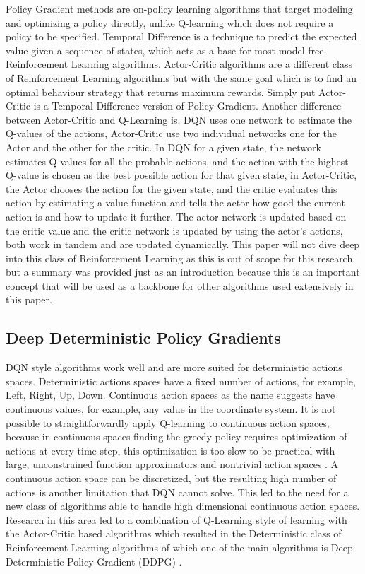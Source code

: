 Policy Gradient \cite{PG} methods are on-policy learning algorithms that target modeling and optimizing a policy directly, unlike Q-learning which does not require a policy to be specified. Temporal Difference \cite{TD} is a technique to predict the expected value given a sequence of states, which acts as a base for most model-free Reinforcement Learning algorithms. Actor-Critic \cite{Konda00actor-criticalgorithms} algorithms are a different class of Reinforcement Learning algorithms but with the same goal which is to find an optimal behaviour strategy that returns maximum rewards.  Simply put Actor-Critic is a Temporal Difference version of Policy Gradient. Another difference between Actor-Critic and Q-Learning is, DQN uses one network to estimate the Q-values of the actions, Actor-Critic use two individual networks one for the Actor and the other for the critic. In DQN for a given state, the network estimates Q-values for all the probable actions, and the action with the highest Q-value is chosen as the best possible action for that given state, in Actor-Critic, the Actor chooses the action for the given state, and the critic evaluates this action by estimating a value function and tells the actor how good the current action is and how to update it further. The actor-network is updated based on the critic value and the critic network is updated by using the actor's actions, both work in tandem and are updated dynamically. This paper will not dive deep into this class of Reinforcement Learning as this is out of scope for this research, but a summary was provided just as an introduction because this is an important concept that will be used as a backbone for other algorithms used extensively in this paper. \\

\subsection{Deep Deterministic Policy Gradients}

DQN style algorithms work well and are more suited for deterministic actions spaces. Deterministic actions spaces have a fixed number of actions, for example, Left, Right, Up, Down. Continuous action spaces as the name suggests have continuous values, for example, any value in the coordinate system. It is not possible to straightforwardly apply Q-learning to continuous action spaces, because in continuous spaces finding the greedy policy requires optimization of actions at every time step, this optimization is too slow to be practical with large, unconstrained function approximators and nontrivial action spaces \cite{lillicrap2019continuous}. A continuous action space can be discretized, but the resulting high number of actions is another limitation that DQN cannot solve. This led to the need for a new class of algorithms able to handle high dimensional continuous action spaces. Research in this area led to a combination of Q-Learning style of learning with the Actor-Critic based algorithms which resulted in the Deterministic class of Reinforcement Learning algorithms of which one of the main algorithms is Deep Deterministic Policy Gradient (DDPG) \cite{lillicrap2019continuous}. \\

